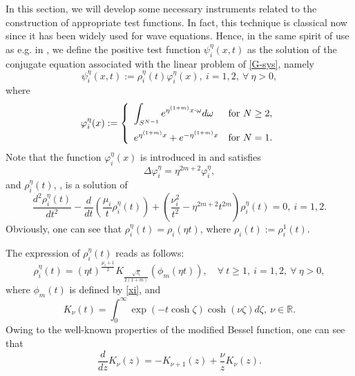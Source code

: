 \documentclass[12pt,leqno]{amsart}
\numberwithin{equation}{section}
\theoremstyle{remark}
\newcommand{\de}{\delta}
\def\d{\displaystyle}
\begin{document}
In this section, we will develop some necessary instruments related to the construction of appropriate test functions. In fact, this technique is classical now since it has been widely used for wave equations. Hence, in the same spirit of use as e.g. in \cite{Our3,Our5,HHP1,HHP2}, we define the  positive test function  $\psi_i^{\eta}(x,t)$ as the solution  of  the conjugate equation associated  with  the linear problem of \eqref{G-sys}, namely 
\begin{equation}
\label{test11}
\psi_i^{\eta}(x,t):=\rho_i^{\eta}(t)\varphi^{\eta}_i(x), \ i=1,2, \ \forall \ \eta >0,
\end{equation}
where
\begin{equation}
\label{test12}
\varphi^{\eta}_i(x):=
\left\{
\begin{array}{ll}
\d\int_{S^{N-1}}e^{\eta^{(1+m)} x\cdot\omega}d\omega & \mbox{for}\ N\ge2,\vspace{.2cm}\\
e^{\eta^{(1+m)} x}+e^{-\eta^{(1+m)} x} & \mbox{for}\  N=1.
\end{array}
\right.
\end{equation}
Note that the function $\varphi^{\eta}_i(x)$ is introduced in \cite{YZ06} and satisfies 
\begin{equation}\label{eq-phi-delta}
\Delta \varphi^{\eta}_i = \eta^{2m+2} \varphi^{\eta}_i,
\end{equation}
 and  $\rho_i^{\eta}(t)$, \cite{Palmieri1,Tu-Lin1,Tu-Lin},   is a solution of 
\begin{equation}\label{lambda}
\frac{d^2 \rho^{\eta}_i(t)}{dt^2}-\frac{d}{dt}\left(\frac{\mu_i}{t}\rho^{\eta}_i(t)\right)+\left(\frac{\nu_i^2}{t^2}-\eta^{2m+2} t^{2m}\right)\rho^{\eta}_i( t)=0, \ i=1,2.
\end{equation}
Obviously, one can see that $\rho^{\eta}_i(t)=\rho_i(\eta t)$, where $\rho_i(t):=\rho^{1}_i(t)$.

The expression of  $\rho^{\eta}_i(t)$ reads as follows:
\begin{equation}\label{lmabdaK}
\d \rho^{\eta}_i(t)=(\eta t)^{\frac{\mu_i+1}{2}}K_{\frac{\sqrt{\de_i}}{2(1+m)}}(\phi_{m}(\eta t)), \quad \forall \ t \ge 1, \ i=1,2, \ \forall \ \eta >0,
\end{equation}
where $\phi_{m}(t)$ is defined by \eqref{xi}, and 
$$K_{\nu}(t)=\int_0^\infty\exp(-t\cosh \zeta)\cosh(\nu \zeta)d\zeta,\ \nu\in \mathbb{R}.$$
Owing to the well-known properties of the modified Bessel function, one can see that
\begin{equation}\label{Knu-pp}
\frac{d}{dz}K_{\nu}(z)=-K_{\nu+1}(z)+\frac{\nu}{z}K_{\nu}(z).
\end{equation}
\end{document}
